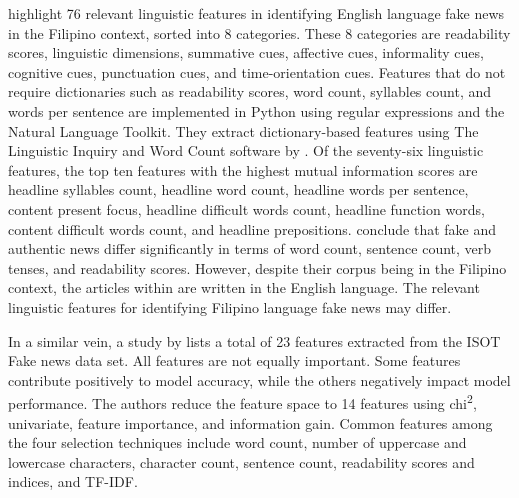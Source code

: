  highlight 76 relevant linguistic features in identifying English language fake news in the Filipino context, sorted into 8 categories. These 8 categories are readability scores, linguistic dimensions, summative cues, affective cues, informality cues, cognitive cues, punctuation cues, and time-orientation cues. Features that do not require dictionaries such as readability scores, word count, syllables count, and words per sentence are implemented in Python using regular expressions and the Natural Language Toolkit. They extract dictionary-based features using The Linguistic Inquiry and Word Count software by . Of the seventy-six linguistic features, the top ten features with the highest mutual information scores are headline syllables count, headline word count, headline words per sentence, content present focus, headline difficult words count, headline function words, content difficult words count, and headline prepositions.  conclude that fake and authentic news differ significantly in terms of word count, sentence count, verb tenses, and readability scores. However, despite their corpus being in the Filipino context, the articles within are written in the English language. The relevant linguistic features for identifying Filipino language fake news may differ.

In a similar vein, a study by  lists a total of 23 features extracted from the ISOT Fake news data set. All features are not equally important. Some features contribute positively to model accuracy, while the others negatively impact model performance. The authors reduce the feature space to 14 features using chi\textsuperscript{2}, univariate, feature importance, and information gain. Common features among the four selection techniques include word count, number of uppercase and lowercase characters, character count, sentence count, readability scores and indices, and TF-IDF.

